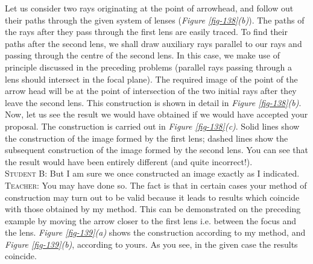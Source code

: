 \documentclass[a4paper,sfsidenotes]{tufte-book}
\begin{document}
Let us consider two rays originating at the point of arrowhead, and follow out their paths through the given system of lenses (\emph{Figure \ref{fig-138}(b)}). The paths of the rays after they pass through the first lens are easily traced. To find their paths after the second lens, we shall draw auxiliary rays parallel to our rays and passing through the centre of the second lens. In this case, we make use of principle discussed in the preceding problems (parallel rays passing through a lens should intersect in the focal plane). The required image of the point of the arrow head will be at the point of intersection of the two initial rays after they leave the second lens. This construction is shown in detail in \emph{Figure \ref{fig-138}(b)}. Now, let us see the result we would have obtained if we would have accepted your proposal. The construction is carried out in \emph{Figure \ref{fig-138}(c)}. Solid lines show the construction of the image formed by the first lens; dashed lines show the subsequent construction of the image formed by the second lens. You can see that the result would have been entirely different (and quite incorrect!). 
\\
\textsc{Student B:} But I am sure we once constructed an image exactly as I indicated.
\\
\textsc{Teacher:} You may have done so. The fact is that in certain cases your  method of construction may turn out to be valid because it leads to results which coincide with those obtained by my method. This can be demonstrated on the preceding example by moving the arrow closer to the first lens i.e. between the focus and the lens. \emph{Figure \ref{fig-139}(a)} shows the construction according to my method, and \emph{Figure \ref{fig-139}(b)}, according to yours. As you see, in the given case the results coincide.
\end{document}
